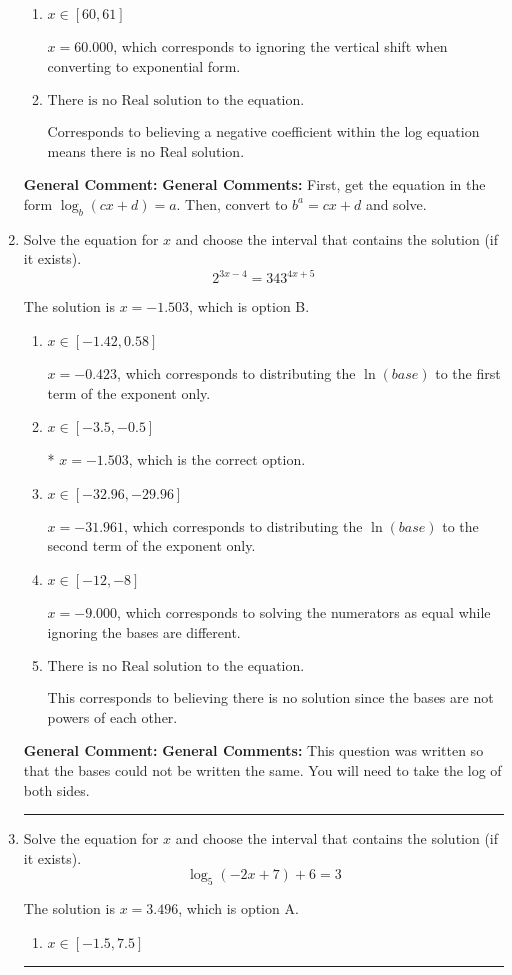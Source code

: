 \documentclass{extbook}[14pt]
\newcommand{\litem}[1]{\item #1

\rule{\textwidth}{0.4pt}}
\begin{document}
\begin{enumerate}
{\begin{enumerate}[label=\Alph*.]
$x = -18.500$, which corresponds to reversing the base and exponent when converting.
\item \( x \in [60, 61] \)

$x = 60.000$, which corresponds to ignoring the vertical shift when converting to exponential form.
\item \( \text{There is no Real solution to the equation.} \)

Corresponds to believing a negative coefficient within the log equation means there is no Real solution.
\end{enumerate}

\textbf{General Comment:} \textbf{General Comments:} First, get the equation in the form $\log_b{(cx+d)} = a$. Then, convert to $b^a = cx+d$ and solve.
}
\litem{
Solve the equation for $x$ and choose the interval that contains the solution (if it exists).
\[ 2^{3x-4} = 343^{4x+5} \]

The solution is \( x = -1.503 \), which is option B.\begin{enumerate}[label=\Alph*.]
\item \( x \in [-1.42, 0.58] \)

$x = -0.423$, which corresponds to distributing the $\ln(base)$ to the first term of the exponent only.
\item \( x \in [-3.5, -0.5] \)

* $x = -1.503$, which is the correct option.
\item \( x \in [-32.96, -29.96] \)

$x = -31.961$, which corresponds to distributing the $\ln(base)$ to the second term of the exponent only.
\item \( x \in [-12, -8] \)

$x = -9.000$, which corresponds to solving the numerators as equal while ignoring the bases are different.
\item \( \text{There is no Real solution to the equation.} \)

This corresponds to believing there is no solution since the bases are not powers of each other.
\end{enumerate}

\textbf{General Comment:} \textbf{General Comments:} This question was written so that the bases could not be written the same. You will need to take the log of both sides.
}
\litem{
Solve the equation for $x$ and choose the interval that contains the solution (if it exists).
\[ \log_{5}{(-2x+7)}+6 = 3 \]

The solution is \( x = 3.496 \), which is option A.\begin{enumerate}[label=\Alph*.]
\item \( x \in [-1.5, 7.5] \)


\end{enumerate}}
\end{enumerate}
\end{document}
